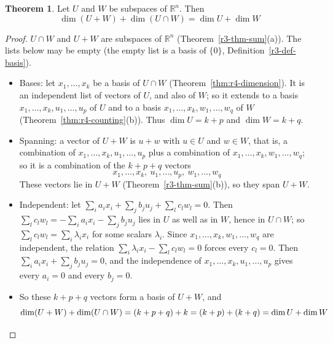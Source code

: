 \documentclass[12pt]{article}
\newcommand{\R}{\mathbb R}
\theoremstyle{definition}
\newtheorem{theorem}{Theorem}
\begin{document}
\begin{theorem}\label{thm:r4-dim-sum}
Let \(U\) and \(W\) be subspaces of \(\R^n\). Then
\[
\dim(U+W)+\dim(U\cap W)=\dim U+\dim W
\]
\end{theorem}
\begin{proof}
\(U\cap W\) and \(U+W\) are subspaces of \(\R^n\) (Theorem~\ref{r3-thm-sum}(a)). The lists below may be empty
(the empty list is a basis of \(\{0\}\), Definition~\ref{r3-def-basis}).
\begin{itemize}
\item Bases: let \(x_1,\dots,x_k\) be a basis of \(U\cap W\) (Theorem~\ref{thm:r4-dimension}). It is an independent
list of vectors of \(U\), and also of \(W\); so it extends to a basis \(x_1,\dots,x_k,u_1,\dots,u_p\) of \(U\) and to a
basis \(x_1,\dots,x_k,w_1,\dots,w_q\) of \(W\) (Theorem~\ref{thm:r4-counting}(b)). Thus \(\dim U=k+p\) and
\(\dim W=k+q\).
\item Spanning: a vector of \(U+W\) is \(u+w\) with \(u\in U\) and \(w\in W\), that is, a combination of
\(x_1,\dots,x_k,u_1,\dots,u_p\) plus a combination of \(x_1,\dots,x_k,w_1,\dots,w_q\); so it is a combination of the
\(k+p+q\) vectors
\[
x_1,\dots,x_k,\ u_1,\dots,u_p,\ w_1,\dots,w_q
\]
These vectors lie in \(U+W\) (Theorem~\ref{r3-thm-sum}(b)), so they span \(U+W\).
\item Independent: let \(\sum_ia_ix_i+\sum_jb_ju_j+\sum_lc_lw_l=0\). Then
\(\sum_lc_lw_l=-\sum_ia_ix_i-\sum_jb_ju_j\) lies in \(U\) as well as in \(W\), hence in \(U\cap W\); so
\(\sum_lc_lw_l=\sum_i\lambda_ix_i\) for some scalars \(\lambda_i\). Since \(x_1,\dots,x_k,w_1,\dots,w_q\) are
independent, the relation \(\sum_i\lambda_ix_i-\sum_lc_lw_l=0\) forces every \(c_l=0\). Then
\(\sum_ia_ix_i+\sum_jb_ju_j=0\), and the
independence of \(x_1,\dots,x_k,u_1,\dots,u_p\) gives every \(a_i=0\) and every \(b_j=0\).
\item So these \(k+p+q\) vectors form a basis of \(U+W\), and
\[
\dim(U+W)+\dim(U\cap W)=(k+p+q)+k=(k+p)+(k+q)=\dim U+\dim W\qedhere
\]
\end{itemize}
\end{proof}
\end{document}
